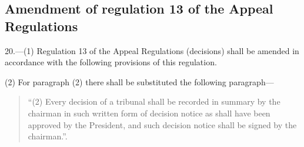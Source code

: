 \documentclass[12pt,a4paper]{article}
\begin{document}
\subsection[20. Amendment of regulation 13 of the Appeal Regulations]{Amendment of regulation 13 of the Appeal Regulations}

20.—(1) Regulation 13 of the Appeal Regulations (decisions) shall be amended in accordance with the following provisions of this regulation.

(2) For paragraph (2) there shall be substituted the following paragraph—
\begin{quotation}
“(2) Every decision of a tribunal shall be recorded in summary by the chairman in such written form of decision notice as shall have been approved by the President, and such decision notice shall be signed by the chairman.”.
\end{quotation}
\end{document}
